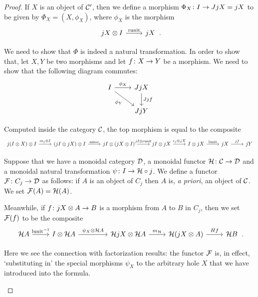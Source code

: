\documentclass{article}
\begin{document}
\begin{proof}
  If $X$ is an object of ${\mathcal{C}}'$, then we define a morphism $\Phi_X\colon I \to JjX=jX$ to be given by $\Phi_X = (X, \phi_X)$, where $\phi_X$ is the morphism
  \[
    \begin{tikzcd}
      jX \tensor I \arrow[r, "\runit"]
        & jX
    \end{tikzcd}\,.
    \]

  We need to show that $\Phi$ is indeed a natural transformation.  
  In order to show that, let $X,Y$ be two morphisms and let $f\colon X \to Y$ be a morphism.  
  We need to show that the following diagram commutes:
  \[
    \begin{tikzcd}
      I \arrow[r, "\phi_X"] \arrow[dr, "\phi_Y"']
        & J j X \arrow[d, "J j f"] \\
        & J j Y
    \end{tikzcd}
    \]

  Computed inside the category ${\mathcal{C}}$, the top morphism is equal to the composite
  \[
    \begin{tikzcd}
      j (I \tensor X) \tensor I \arrow[r, "m_j\tensor I"]
        & (j I \tensor j X) \tensor I \arrow[r, "\assoc"]
          & j I \tensor (j X \tensor I) \arrow[r, "j I \tensor \runit"]
            & j I \tensor j X \arrow[r, "\epsilon_j\tensor j X"]
              & I \tensor j X \arrow[r, "\lunit"]
                & j X \arrow[r, "j f"]
                  & j Y
    \end{tikzcd}
    \]

  Suppose that we have a monoidal category ${\mathcal{D}}$, a monoidal functor $\mathcal H\colon{\mathcal{C}}\to{\mathcal{D}}$ and a monoidal natural transformation $\psi\colon I \to \mathcal H\circ j$.  
  We define a functor $\mathcal F\colon C_j\to {\mathcal{D}}$ as follows: if $A$ is an object of $C_j$ then $A$ is, \emph{a priori}, an object of ${\mathcal{C}}$.  
  We set $\mathcal F(A) = \mathcal H(A)$.  

  Meanwhile, if $f\colon jX \otimes A \to B$ is a morphism from $A$ to $B$ in $C_j$, then we set $\mathcal F(f)$ to be the composite
  \[
    \begin{tikzcd}
      \H A \arrow[r, "\lunit\inv"]
        & I \tensor \H A \arrow[r, "\psi_X\tensor \H A"]
          &[18pt] \H j X \tensor \H A \arrow[r, "m_\H"]
            & \H(jX\tensor A) \arrow[r, "Hf"]
              & \H B
    \end{tikzcd}\,.
    \]
  \begin{remark}
    Here we see the connection with factorization results: the functor $\mathcal F$ is, in effect, `substituting in' the special morphisms $\psi_X$ to the arbitrary hole $X$ that we have introduced into the formula.
  \end{remark}


\end{proof}
\end{document}
